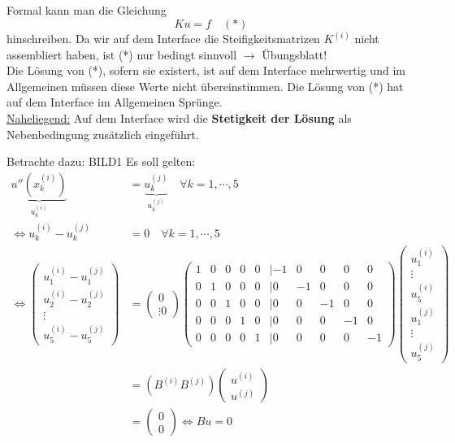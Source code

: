 Formal kann man die Gleichung 
\begin{equation}
  Ku=f \quad (*)
\end{equation}
hinschreiben. Da wir auf dem Interface die Steifigkeitsmatrizen $K^{(i)}$ nicht assembliert haben, ist (*) nur bedingt sinnvoll $\rightarrow$ Übungsblatt!\\
Die Lösung von (*), sofern sie existert, ist auf dem Interface mehrwertig und im Allgemeinen müssen diese Werte nicht übereinstimmen. Die Lösung von (*) hat auf dem Interface im Allgemeinen Sprünge.\\

\underline{Naheliegend:} Auf dem Interface wird die \textbf{Stetigkeit der Lösung} als Nebenbedingung zusätzlich eingeführt.

Betrachte dazu:
BILD1
Es soll gelten: \\
\begin{align*}
  \underbrace{u''(x_k^{(i)})}_{u_k^{(i)}} &= \underbrace{u_k^{(j)}}_{u_k^{(j)}} \quad \forall k=1,\cdots ,5\\
  \Leftrightarrow u_k^{(i)} - u_k^{(j)} &= 0 \quad \forall k=1,\cdots ,5\\
  \Leftrightarrow 
  \begin{pmatrix}
    u_1^{(i)}-u_1^{(j)}\\
    u_2^{(i)}-u_2^{(j)}\\
    \vdots\\
    u_5^{(i)}-u_5^{(j)}  
  \end{pmatrix}
  &=
  \begin{pmatrix}
    0\\ \vdots 0
  \end{pmatrix}
  \begin{pmatrix}
    1& 0& 0& 0& 0& | -1& 0& 0& 0& 0\\
    0& 1& 0& 0& 0& | 0& -1& 0& 0& 0\\
    0& 0& 1& 0& 0& | 0& 0& -1& 0& 0\\
    0& 0& 0& 1& 0& | 0& 0& 0& -1& 0\\
    0& 0& 0& 0& 1& | 0& 0& 0& 0& -1
  \end{pmatrix}
  \begin{pmatrix}
    u^{(i)}_1\\
    \vdots\\
    u^{(i)}_5\\
    u^{(j)}_1\\
    \vdots\\
    u^{(j)}_5
  \end{pmatrix}\\
  &= 
  (B^{(i)} B^{(j)}) %
  \begin{pmatrix}
    u^{(i)}\\
    u^{(j)}
  \end{pmatrix}\\
  &=
  \begin{pmatrix}
    0\\
    0
  \end{pmatrix}
  \Leftrightarrow 
  Bu=0
\end{align*}

